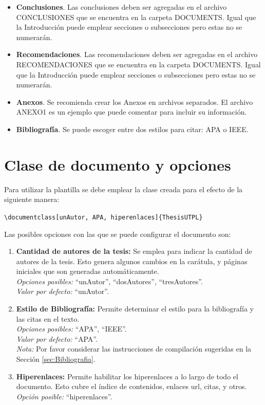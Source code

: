 \begin{itemize}
	\item \textbf{Conclusiones}. Las conclusiones deben ser agregadas en el archivo CONCLUSIONES que se encuentra en la carpeta DOCUMENTS. Igual que la Introducción puede emplear secciones o subsecciones pero estas no se numerarán.  
	\item \textbf{Recomendaciones}. Las recomendaciones deben ser agregadas en el archivo RECOMENDACIONES que se encuentra en la carpeta DOCUMENTS. Igual que la Introducción puede emplear secciones o subsecciones pero estas no se numerarán.   	
	\item \textbf{Anexos}. Se recomienda crear los Anexos en archivos separados. El archivo ANEXO1 es un ejemplo que puede comentar para incluir su información.  
	\item \textbf{Bibliografía}. Se puede escoger entre dos estilos para citar: APA o IEEE. 
\end{itemize}

\section{Clase de documento y opciones}

Para utilizar la plantilla se debe emplear la clase creada para el efecto de la siguiente manera: 

\lstinline|\documentclass[unAutor, APA, hiperenlaces]{ThesisUTPL}| 

Las posibles opciones con las que se puede configurar el documento son: 

\begin{enumerate}
	\item \textbf{Cantidad de autores de la tesis:} Se emplea para indicar la cantidad de autores de la tesis. Esto genera algunos cambios en la carátula, y páginas iniciales que son generadas automáticamente. \\
	\textit{Opciones posibles:} ``unAutor'', ``dosAutores'', ``tresAutores''. \\
	\textit{Valor por defecto:} ``unAutor''.
	\item \textbf{Estilo de Bibliografía:} Permite determinar el estilo para la bibliografía y las citas en el texto. \\
	\textit{Opciones posibles:} ``APA'', ``IEEE''.\\
	\textit{Valor por defecto:} ``APA''. \\
	\textit{Nota:} Por favor considerar las instrucciones de compilación sugeridas en la Sección \ref{sec:Bibliografia}.
	
	\item \textbf{Hiperenlaces:} Permite habilitar los hiperenlaces a lo largo de todo el documento. Esto cubre el índice de contenidos, enlaces url, citas, y otros. \\
	\textit{Opción posible:} ``hiperenlaces''. 
	
\end{enumerate}

